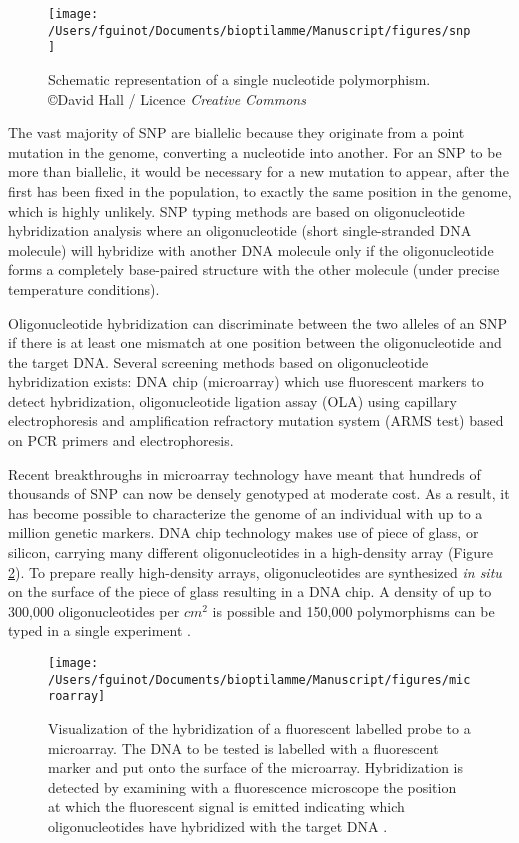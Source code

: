\documentclass[]{book}
\begin{document}
\begin{figure}

{\centering \texttt{[image: /Users/fguinot/Documents/bioptilamme/Manuscript/figures/snp]} 

}

\caption{Schematic representation of a single nucleotide polymorphism. \copyright David Hall / Licence \textit{Creative Commons}}\label{fig:snp}
\end{figure}

The vast majority of SNP are biallelic because they originate from a
point mutation in the genome, converting a nucleotide into another. For
an SNP to be more than biallelic, it would be necessary for a new
mutation to appear, after the first has been fixed in the population, to
exactly the same position in the genome, which is highly unlikely. SNP
typing methods are based on oligonucleotide hybridization analysis where
an oligonucleotide (short single-stranded DNA molecule) will hybridize
with another DNA molecule only if the oligonucleotide forms a completely
base-paired structure with the other molecule (under precise temperature
conditions).

Oligonucleotide hybridization can discriminate between the two alleles
of an SNP if there is at least one mismatch at one position between the
oligonucleotide and the target DNA. Several screening methods based on
oligonucleotide hybridization exists: DNA chip (microarray) which use
fluorescent markers to detect hybridization, oligonucleotide ligation
assay (OLA) using capillary electrophoresis and amplification refractory
mutation system (ARMS test) based on PCR primers and electrophoresis.

Recent breakthroughs in microarray technology have meant that hundreds
of thousands of SNP can now be densely genotyped at moderate cost. As a
result, it has become possible to characterize the genome of an
individual with up to a million genetic markers. DNA chip technology
makes use of piece of glass, or silicon, carrying many different
oligonucleotides in a high-density array (Figure \ref{fig:microarray}). To
prepare really high-density arrays, oligonucleotides are synthesized \emph{in
situ} on the surface of the piece of glass resulting in a DNA chip. A
density of up to 300,000 oligonucleotides per \(cm^2\) is possible and
150,000 polymorphisms can be typed in a single experiment
\citep{brown2007genomes}.



\begin{figure}

{\centering \texttt{[image: /Users/fguinot/Documents/bioptilamme/Manuscript/figures/microarray]} 

}

\caption{Visualization of the hybridization of a fluorescent labelled probe to a microarray. The DNA to be tested is labelled with a fluorescent marker and put onto the surface of the microarray. Hybridization is detected by examining with a fluorescence microscope the position at which the fluorescent signal is emitted indicating which oligonucleotides have hybridized with the target DNA \citep{brown2007genomes}.}\label{fig:microarray}
\end{figure}
\end{document}
